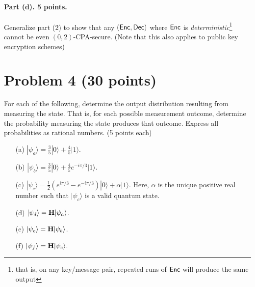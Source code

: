 \documentclass{article}
\begin{document}
\paragraph{Part (d). 5 points.} Generalize part (2) to show that any $({\sf Enc},{\sf Dec})$ where ${\sf Enc}$ is \emph{deterministic}\footnote{that is, on any key/message pair, repeated runs of ${\sf Enc}$ will produce the same output} cannot be even $(0,2)$-CPA-secure. (Note that this also applies to public key encryption schemes)


\section{Problem 4 (30 points)}

For each of the following, determine the output distribution resulting from measuring the state. That is, for each possible measurement outcome, determine the probability measuring the state produces that outcome. Express all probabilities as rational numbers. (5 points each)

\begin{itemize}
    \item[(a)] $|\psi_a\rangle=\frac{3}{5}|0\rangle+\frac{4}{5}|1\rangle$.
    \item[(b)] $|\psi_b\rangle=\frac{3}{5}|0\rangle+\frac{4}{5}e^{-i\pi/3}|1\rangle$.
    \item[(c)] $|\psi_c\rangle=\frac{1}{2}\left(e^{i\pi/3}-e^{-i\pi/3}\right)|0\rangle+\alpha|1\rangle$. Here, $\alpha$ is the unique positive real number such that $|\psi_c\rangle$ is a valid quantum state.
    \item[(d)] $|\psi_d\rangle={\mathbf{H}}|\psi_a\rangle$.
    \item[(e)] $|\psi_e\rangle={\mathbf{H}}|\psi_b\rangle$.
    \item[(f)] $|\psi_f\rangle={\mathbf{H}}|\psi_c\rangle$.
\end{itemize}
\end{document}

